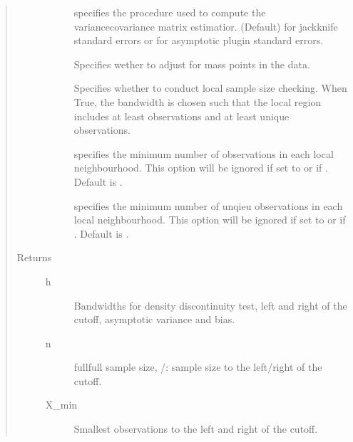 \documentclass[letterpaper,10pt,english]{sphinxmanual}
\begin{document}
\begin{fulllineitems}
\begin{quote}
\begin{description}
\begin{description}
\item[{}] \leavevmode
\sphinxAtStartPar
specifies the procedure used to compute the variance\sphinxhyphen{}covariance matrix estimatior.  (Default) for jackknife standard errors or  for asymptotic plug\sphinxhyphen{}in standard errors.

\item[{}] \leavevmode
\sphinxAtStartPar
Specifies wether to adjust for mass points in the data.

\item[{}] \leavevmode
\sphinxAtStartPar
Specifies whether to conduct local sample size checking. When True, the bandwidth is chosen such that the local region includes at least  observations and at least  unique observations.

\item[{}] \leavevmode
\sphinxAtStartPar
specifies the minimum number of observations in each local neighbourhood. This option will be ignored if set to  or if . Default is .

\item[{}] \leavevmode
\sphinxAtStartPar
specifies the minimum number of unqieu observations in each local neighbourhood. This option will be ignored if set to  or if . Default is .

\end{description}

\item[{Returns}] \leavevmode\begin{description}
\item[{h}] \leavevmode
\sphinxAtStartPar
Bandwidths for density discontinuity test, left and right of the cutoff, asymptotic variance and bias.

\item[{n}] \leavevmode
\sphinxAtStartPar
full\sphinxhyphen{}full sample size, /: sample size to the left/right of the cutoff.

\item[{X\_min}] \leavevmode
\sphinxAtStartPar
Smallest observations to the left and right of the cutoff.


\end{description}
\end{description}
\end{quote}
\end{fulllineitems}
\end{document}
